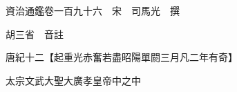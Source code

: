 










 


 
 


 

  
  
  
  
  





  
  
  
  
  
 
  

  

  
  
  



  

 
 

  
   




  

  
  


  　　資治通鑑卷一百九十六　宋　司馬光　撰

　　胡三省　音註

　　唐紀十二【起重光赤奮若盡昭陽單閼三月凡二年有奇】

　　太宗文武大聖大廣孝皇帝中之中

